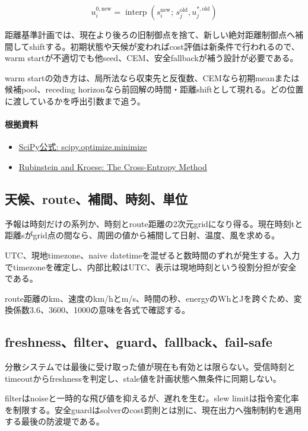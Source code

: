 \documentclass[a4paper,11pt]{article}
\begin{document}
\[
u^{0,\mathrm{new}}_i=\operatorname{interp}\left(s_i^{\mathrm{new}};\,s_j^{\mathrm{old}},u_j^{\ast,\mathrm{old}}\right)
\]

距離基準計画では、現在より後ろの旧制御点を捨て、新しい絶対距離制御点へ補間してshiftする。初期状態や天候が変わればcost評価は新条件で行われるので、warm startが不適切でも他seed、CEM、安全fallbackが補う設計が必要である。


warm startの効き方は、局所法なら収束先と反復数、CEMなら初期meanまたは候補pool、receding horizonなら前回解の時間・距離shiftとして現れる。どの位置に渡しているかを呼出引数まで追う。

\paragraph{根拠資料}
\begin{itemize}[leftmargin=1.6em]
\item \href{https://docs.scipy.org/doc/scipy/reference/generated/scipy.optimize.minimize.html}{SciPy公式: scipy.optimize.minimize}
\item \href{https://link.springer.com/book/10.1007/978-1-4757-4321-0}{Rubinstein and Kroese: The Cross-Entropy Method}
\end{itemize}

\subsection{天候、route、補間、時刻、単位}
予報は時刻だけの系列か、時刻とroute距離の2次元gridになり得る。現在時刻tと距離sがgrid点の間なら、周囲の値から補間して日射、温度、風を求める。


UTC、現地timezone、naive datetimeを混ぜると数時間のずれが発生する。入力でtimezoneを確定し、内部比較はUTC、表示は現地時刻という役割分担が安全である。


route距離のkm、速度のkm/hとm/s、時間の秒、energyのWhとJを跨ぐため、変換係数3.6、3600、1000の意味を各式で確認する。



\subsection{freshness、filter、guard、fallback、fail-safe}
分散システムでは最後に受け取った値が現在も有効とは限らない。受信時刻とtimeoutからfreshnessを判定し、stale値を計画状態へ無条件に同期しない。


filterはnoiseと一時的な飛び値を抑えるが、遅れを生む。slew limitは指令変化率を制限する。安全guardはsolverのcost罰則とは別に、現在出力へ強制制約を適用する最後の防波堤である。
\end{document}
